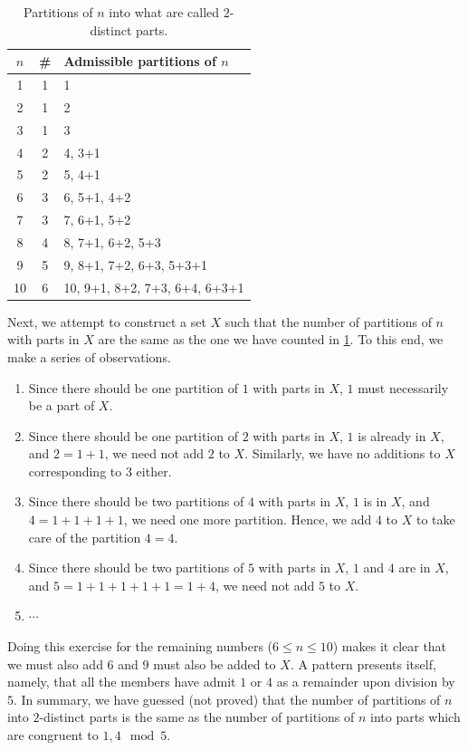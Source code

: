 \begin{table}[H]
\centering
\begin{tabular}{|c|c|l|}
\hline
$n$ & \# & Admissible partitions of $n$ \\
\hline
1 & 1 & 1 \\
2 & 1 & 2 \\
3 & 1 & 3 \\
4 & 2 & 4, 3+1 \\
5 & 2 & 5, 4+1 \\
6 & 3 & 6, 5+1, 4+2 \\
7 & 3 & 7, 6+1, 5+2 \\
8 & 4 & 8, 7+1, 6+2, 5+3 \\
9 & 5 & 9, 8+1, 7+2, 6+3, 5+3+1 \\
10 & 6 & 10, 9+1, 8+2, 7+3, 6+4, 6+3+1 \\
\hline
\end{tabular}
\caption{Partitions of $n$ into what are called $2$-distinct parts.}
\label{table:1}
\end{table}
\raggedbottom
Next, we attempt to construct a set $X$ such that the number of partitions of $n$ with parts in $X$ are the same as the one we have counted in \cref{table:1}. To this end, we make a series of observations.
\begin{enumerate}
    \item Since there should be one partition of $1$ with parts in $X$, $1$ must necessarily be a part of $X$.
    \item Since there should be one partition of $2$ with parts in $X$, $1$ is already in $X$, and $2=1+1$, we need not add $2$ to $X$. Similarly, we have no additions to $X$ corresponding to $3$ either.
    \item Since there should be two partitions of $4$ with parts in $X$, $1$ is in $X$, and $4=1+1+1+1$, we need one more partition. Hence, we add $4$ to $X$ to take care of the partition $4=4$. 
    \item Since there should be two partitions of $5$ with parts in $X$, $1$ and $4$ are in $X$, and $5=1+1+1+1+1=1+4$, we need not add $5$ to $X$.
    \item $\cdots$
\end{enumerate}
Doing this exercise for the remaining numbers ($6\leq n\leq 10$) makes it clear that we must also add $6$ and $9$ must also be added to $X$. A pattern presents itself, namely, that all the members have admit $1$ or $4$ as a remainder upon division by $5$. In summary, we have guessed (not proved) that the number of partitions of $n$ into $2$-distinct parts is the same as the number of partitions of $n$ into parts which are congruent to $1,4\mod{5}$.  

